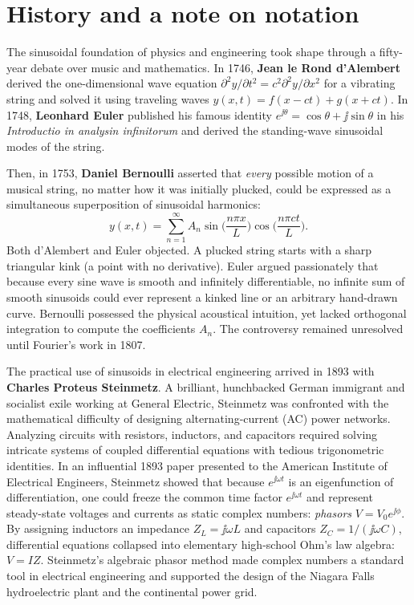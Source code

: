 \section{History and a note on notation}
\label{ch04:history}

\begin{historybox}
The sinusoidal foundation of physics and engineering took shape through a fifty-year debate
over music and mathematics. In 1746, \textbf{Jean le Rond d'Alembert} derived the one-dimensional
wave equation $\partial^2 y/\partial t^2 = c^2 \partial^2 y/\partial x^2$ for a vibrating string and
solved it using traveling waves $y(x,t) = f(x-ct) + g(x+ct)$. In 1748, \textbf{Leonhard Euler}
published his famous identity $e^{\jj\theta} = \cos\theta + \jj\sin\theta$ in his \emph{Introductio
in analysin infinitorum} and derived the standing-wave sinusoidal modes of the string.

Then, in 1753, \textbf{Daniel Bernoulli} asserted that \emph{every}
possible motion of a musical string, no matter how it was initially plucked, could be expressed
as a simultaneous superposition of sinusoidal harmonics:
\[
  y(x,t) = \sum_{n=1}^\infty A_n \sin\Big(\frac{n\pi x}{L}\Big)\cos\Big(\frac{n\pi c t}{L}\Big).
\]
Both d'Alembert and Euler objected. A plucked string starts with a sharp triangular kink
(a point with no derivative). Euler argued passionately that because every sine wave is smooth and
infinitely differentiable, no infinite sum of smooth sinusoids could ever represent a kinked line or
an arbitrary hand-drawn curve. Bernoulli possessed the physical
acoustical intuition, yet lacked orthogonal integration to compute the coefficients
$A_n$. The controversy remained unresolved until Fourier's work in 1807.

The practical use of sinusoids in electrical engineering arrived in 1893 with \textbf{Charles
Proteus Steinmetz}. A brilliant, hunchbacked German immigrant and socialist exile working at General
Electric, Steinmetz was confronted with the mathematical difficulty of designing alternating-current
(AC) power networks. Analyzing circuits with resistors, inductors, and capacitors required solving
intricate systems of coupled differential equations with tedious trigonometric identities. In an
influential 1893 paper presented to the American Institute of Electrical Engineers, Steinmetz
showed that because $e^{\jj\omega t}$ is an eigenfunction of differentiation, one could freeze the
common time factor $e^{\jj\omega t}$ and represent steady-state voltages and currents as static
complex numbers: \emph{phasors} $V = V_0 e^{\jj\phi}$. By assigning inductors an impedance
$Z_L = \jj\omega L$ and capacitors $Z_C = 1/(\jj\omega C)$, differential equations collapsed into
elementary high-school Ohm's law algebra: $V = I Z$. Steinmetz's algebraic phasor method made
complex numbers a standard tool in electrical engineering and supported the design of the Niagara Falls
hydroelectric plant and the continental power grid.
\end{historybox}

